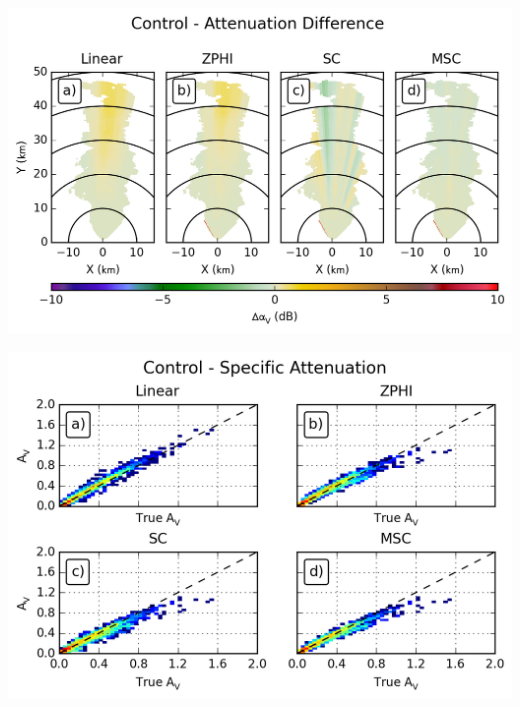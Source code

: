 \documentclass[red]{beamer}
\begin{document}
\begin{frame}
    \begin{center}
        \includegraphics[scale=0.7]{figures/spatial/C_Control_Attenuation_Difference_V}
    \end{center}
\end{frame}

\begin{frame}
    \begin{center}
        \includegraphics[scale=0.7]{figures/spatial/C_Control_Specific_Attenuation_V_scatter}
    \end{center}
\end{frame}
\end{document}
